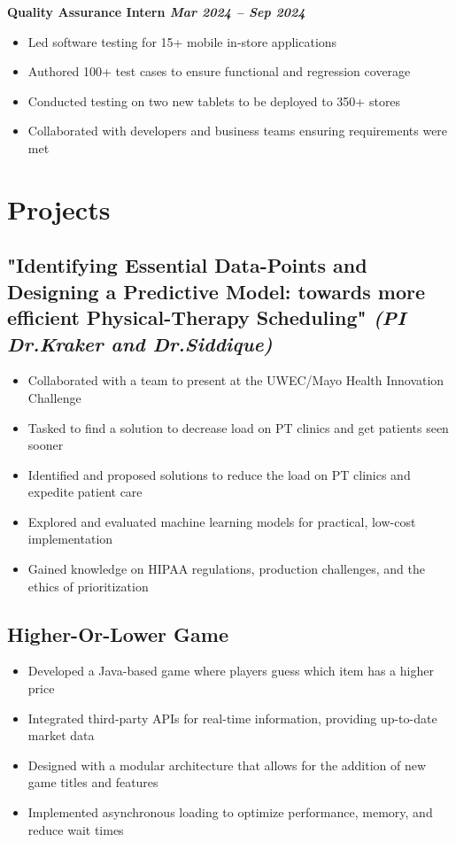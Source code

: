 \documentclass[a4paper,10pt]{article}
\begin{document}
\hspace{12pt}\textbf{{Quality Assurance Intern} \hfill \textit{Mar 2024 – Sep 2024}} \\
\vspace{-1em}
{\fontsize{12}{15}\selectfont
\begin{itemize}[leftmargin=30pt]
    \item Led software testing for 15+ mobile in-store applications
    \item Authored 100+ test cases to ensure functional and regression coverage
    \item Conducted testing on two new tablets to be deployed to 350+ stores
    \item Collaborated with developers and business teams ensuring requirements were met
\end{itemize}
}


\section*{Projects}
\subsection*{{\fontsize{12}{15}\selectfont "Identifying Essential Data-Points and Designing a Predictive Model: towards more efficient Physical-Therapy Scheduling"   } \normalsize \textit{(PI Dr.Kraker and Dr.Siddique)}}
{\fontsize{12}{15}\selectfont
\begin{itemize}[leftmargin=30pt]
    \item Collaborated with a team to present at the UWEC/Mayo Health Innovation Challenge
    \item Tasked to find a solution to decrease load on PT clinics and get patients seen sooner
    \item Identified and proposed solutions to reduce the load on PT clinics and expedite patient care
    \item Explored and evaluated machine learning models for practical, low-cost implementation
    \item Gained knowledge on HIPAA regulations, production challenges, and the ethics of prioritization
\end{itemize}
}
\subsection*{Higher-Or-Lower Game}
{\fontsize{12}{15}\selectfont
\begin{itemize}[leftmargin=30pt]
    \item Developed a Java-based game where players guess which item has a higher price
    \item Integrated third-party APIs for real-time information, providing up-to-date market data 
    \item Designed with a modular architecture that allows for the addition of new game titles and features
    \item Implemented asynchronous loading to optimize performance, memory, and reduce wait times
\end{itemize}
}
\end{document}
